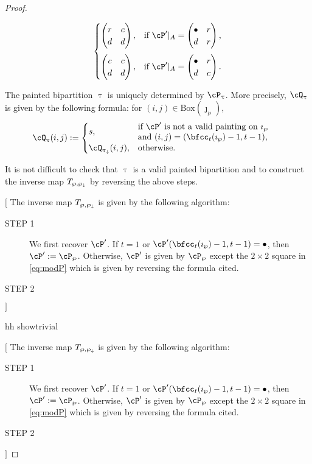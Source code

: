 \documentclass[12pt,a4paper]{amsart}
\newcommand{\trivial}[2][]{\if\relax\detokenize{#1}\relax
  {%
      \color{orange} \vspace{0em} $[$  #2 $]$
      \color{black}
  }
  \else
\ifx#1h
\ifcsname showtrivial\endcsname
{%
    \color{orange} \vspace{0em}  $[$ #2 $]$
    \color{black}
}
\fi
\else {\red Wrong argument!} \fi
\fi
}
\numberwithin{equation}{section}
\theoremstyle{remark}
\def\BOX#1{\mathrm{Box}(#1)}
\begin{document}
\begin{proof}
\begin{description}
\begin{itemize}
\begin{equation}
\begin{split}
\begin{cases}
                  \begin{pmatrix}
                    r & c\\
                    d & d
                  \end{pmatrix}, & \text{if } \cP'|_A =
                  \begin{pmatrix}
                    \bullet & r\\
                    d & r
                  \end{pmatrix},\\[1.5em]
                  \begin{pmatrix}
                    c & c\\
                    d & d
                  \end{pmatrix}, & \text{if } \cP'|_A =
                  \begin{pmatrix}
                    \bullet & r\\
                    d & c
                  \end{pmatrix}.\\
                \end{cases}
              \end{split}
            \end{equation}
          \end{itemize}

    \item[STEP 3] The painted bipartition $\uptau$ is uniquely determined by
          $\cP_{\uptau}$. More precisely, $\cQ_{\uptau}$ is given by the following
          formula: for $(i,j)\in \BOX{\jmath_{\wp}}$,
          \[
          \cQ_{\uptau}(i,j) :=
          \begin{cases}
            s, & \begin{minipage}{17em}if $\cP'$ is not a valid painting on $\imath_{\wp}$\\
              and $(i,j)= (\bfcc_{t}(\imath_{\wp})-1,t-1)$,
              \end{minipage}\\
            \cQ_{\uptaum}(i,j), & \text{otherwise.}
            \end{cases}
          \]
  \end{description}

 It is not difficult to check that $\uptau$ is a valid painted bipartition
 and to construct the inverse map $T_{\wp,\wp_{\downarrow}}$ by reversing the above steps.

 \trivial[h]{
   The inverse map $T_{\wp,\wp_{\downarrow}}$ is given by the following algorithm:
   \begin{description}
     \item[STEP 1] We first recover $\cP'$.
           If $t=1$ or $\cP'(\bfcc_{t}(\imath_{\wp})-1,t-1)=\bullet$, then
           $\cP':= \cP_{\wp}$.
           Otherwise,
           $\cP'$ is given by $\cP_{\wp}$ except the $2\times 2$ square in
           \eqref{eq:modP} which is given by reversing the formula cited.
     \item[STEP 2]


\end{description}}
\end{proof}
\end{document}

